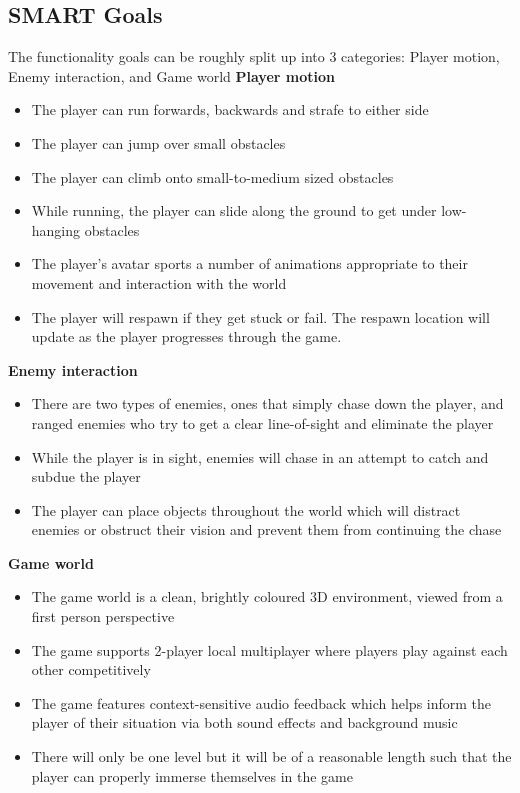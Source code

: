 \documentclass[a4paper,10pt]{article}
\begin{document}
\subsection{SMART Goals}
The functionality goals can be roughly split up into 3 categories: Player motion, Enemy interaction, and Game world
\textbf{Player motion}
\begin{itemize}
	\item The player can run forwards, backwards and strafe to either side
	\item The player can jump over small obstacles
	\item The player can climb onto small-to-medium sized obstacles
	\item While running, the player can slide along the ground to get under low-hanging obstacles
	\item The player's avatar sports a number of animations appropriate to their movement and interaction with the world
	\item The player will respawn if they get stuck or fail. The respawn location will update as the player progresses through the game.
\end{itemize}
\textbf{Enemy interaction}
\begin{itemize}
	\item There are two types of enemies, ones that simply chase down the player, and ranged enemies who try to get a clear line-of-sight and eliminate the player
	\item While the player is in sight, enemies will chase in an attempt to catch and subdue the player
	\item The player can place objects throughout the world which will distract enemies or obstruct their vision and prevent them from continuing the chase
\end{itemize}
\textbf{Game world}
\begin{itemize}
	\item The game world is a clean, brightly coloured 3D environment, viewed from a first person perspective
	\item The game supports 2-player local multiplayer where players play against each other competitively
	\item The game features context-sensitive audio feedback which helps inform the player of their situation via both sound effects and background music
	\item There will only be one level but it will be of a reasonable length such that the player can properly immerse themselves in the game
\end{itemize}
\end{document}
